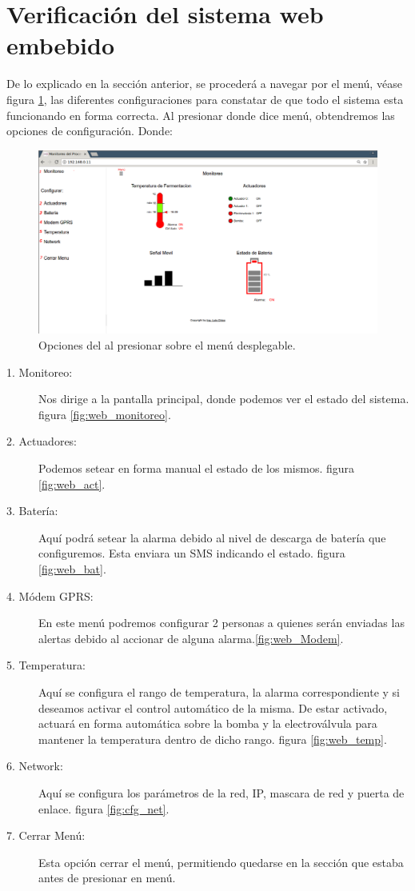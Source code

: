 \section{Verificación del sistema web embebido} 
De lo explicado en la sección anterior, se procederá a navegar por el menú, véase figura \ref{fig:web_menus_num}, las diferentes configuraciones para constatar de que todo el sistema esta funcionando en forma correcta. Al presionar donde dice menú, obtendremos las opciones de configuración. Donde:

\begin{figure}[h]
  \centering
  \includegraphics[scale=.25]{./Figures/web_menus_num.png}
  \caption{Opciones del al presionar sobre el menú desplegable.}
  \label{fig:web_menus_num}
\end{figure}



\begin{description}
  \item[1. Monitoreo:] Nos dirige a la pantalla principal, donde podemos ver el estado del sistema. figura \ref{fig:web_monitoreo}.
  \item[2. Actuadores:] Podemos setear en forma manual el estado de los mismos. figura \ref{fig:web_act}.
  \item[3. Batería:] Aquí podrá setear la alarma debido al nivel de descarga de batería que configuremos. Esta enviara un SMS indicando el estado. figura \ref{fig:web_bat}.
  \item[4. Módem GPRS:] En este menú podremos configurar 2 personas a quienes serán enviadas las alertas debido al accionar de alguna alarma.\ref{fig:web_Modem}.
  \item[5. Temperatura:] Aquí se configura el rango de temperatura, la alarma correspondiente y si deseamos activar el control automático de la misma. De estar activado, actuará en forma automática sobre la bomba y la electroválvula para mantener la temperatura dentro de dicho rango. figura \ref{fig:web_temp}.
  \item[6. Network:] Aquí se configura los parámetros de la red, IP, mascara de red y puerta de enlace. figura \ref{fig:cfg_net}.
  \item[7. Cerrar Menú:] Esta opción cerrar el menú, permitiendo quedarse en la sección que estaba antes de presionar en menú.
\end{description}

